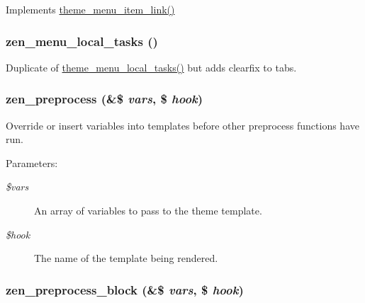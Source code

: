 Implements \hyperlink{group__themeable_g77f59240b3aead5df8a777e4f69961b5}{theme\_\-menu\_\-item\_\-link()} \hypertarget{sites_2all_2themes_2zen_2template_8php_5a939997bd1b280d7d3829e0576f2a5a}{
\subsubsection[{zen\_\-menu\_\-local\_\-tasks}]{\setlength{\rightskip}{0pt plus 5cm}zen\_\-menu\_\-local\_\-tasks ()}}
\label{sites_2all_2themes_2zen_2template_8php_5a939997bd1b280d7d3829e0576f2a5a}


Duplicate of \hyperlink{group__themeable_g11a9f127932a0b272cc0c0dabb4e7d0b}{theme\_\-menu\_\-local\_\-tasks()} but adds clearfix to tabs. \hypertarget{sites_2all_2themes_2zen_2template_8php_34cb06c8098f8e1c710c501bb9a64d8b}{
\subsubsection[{zen\_\-preprocess}]{\setlength{\rightskip}{0pt plus 5cm}zen\_\-preprocess (\&\$ {\em vars}, \/  \$ {\em hook})}}
\label{sites_2all_2themes_2zen_2template_8php_34cb06c8098f8e1c710c501bb9a64d8b}


Override or insert variables into templates before other preprocess functions have run.

\begin{Desc}
\item[Parameters:]
\begin{description}
\item[{\em \$vars}]An array of variables to pass to the theme template. \item[{\em \$hook}]The name of the template being rendered. \end{description}
\end{Desc}
\hypertarget{sites_2all_2themes_2zen_2template_8php_1004cb430e9ecab4c4dc373a30e2340e}{
\subsubsection[{zen\_\-preprocess\_\-block}]{\setlength{\rightskip}{0pt plus 5cm}zen\_\-preprocess\_\-block (\&\$ {\em vars}, \/  \$ {\em hook})}}
\label{sites_2all_2themes_2zen_2template_8php_1004cb430e9ecab4c4dc373a30e2340e}


